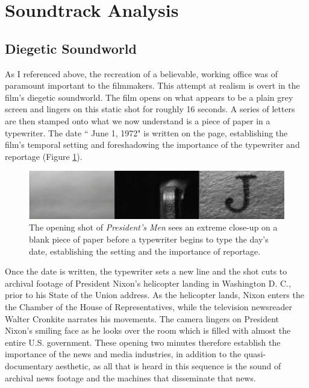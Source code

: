 \section{Soundtrack Analysis}


\subsection{Diegetic Soundworld}


As I referenced above, the recreation of a believable, working office was of paramount important to the filmmakers.
This attempt at realism is overt in the film's diegetic soundworld.
The film opens on what appears to be a plain grey screen and lingers on this static shot for roughly 16 seconds.
A series of letters are then stamped onto what we now understand is a piece of paper in a typewriter.
The date `` June 1, 1972" is written on the page, establishing the film's temporal setting and foreshadowing the importance of the typewriter and reportage (Figure \ref{fig:president-opening-type}).

\begin{figure}
    \centering
    \includegraphics[width=1\linewidth]{img/president-opening-type.pdf}
    \caption{The opening shot of \textit{President's Men} sees an extreme close-up on a blank piece of paper before a typewriter begins to type the day's date, establishing the setting and the importance of reportage.}
    \label{fig:president-opening-type}
\end{figure}

Once the date is written, the typewriter sets a new line and the shot cuts to archival footage of President Nixon's helicopter landing in Washington D. C., prior to his State of the Union address.
As the helicopter lands, Nixon enters the the Chamber of the House of Representatives, while the television newsreader Walter Cronkite narrates his movements.
The camera lingers on President Nixon's smiling face as he looks over the room which is filled with almost the entire U.S. government.
These opening two minutes therefore establish the importance of the news and media industries, in addition to the quasi-documentary aesthetic, as all that is heard in this sequence is the sound of archival news footage and the machines that disseminate that news.

